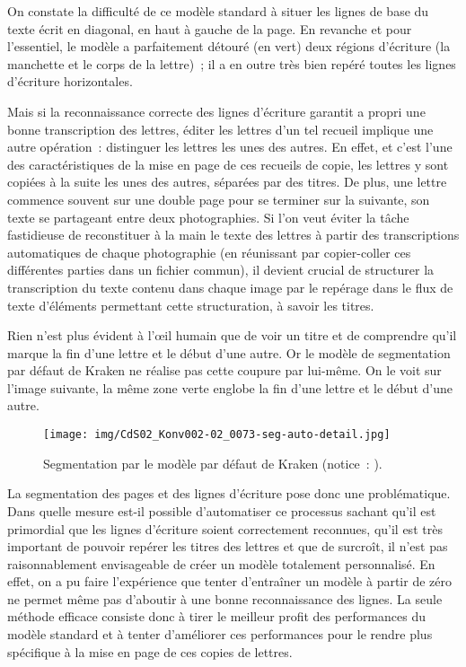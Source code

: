\documentclass[a4paper,12pt,twoside]{book}
\begin{document}
				On constate la difficulté de ce modèle standard à situer les lignes de base du texte écrit en diagonal, en haut à gauche de la page. En revanche et pour l'essentiel, le modèle a parfaitement détouré (en vert) deux régions d'écriture (la manchette et le corps de la lettre)~; il a en outre très bien repéré toutes les lignes d'écriture horizontales.
				
				Mais si la reconnaissance correcte des lignes d'écriture garantit a propri une bonne transcription des lettres, éditer les lettres d'un tel recueil implique une autre opération~: distinguer les lettres les unes des autres. En effet, et c'est l'une des caractéristiques de la mise en page de ces recueils de copie, les lettres y sont copiées à la suite les unes des autres, séparées par des titres. De plus, une lettre commence souvent sur une double page pour se terminer sur la suivante, son texte se partageant entre deux photographies. Si l'on veut éviter la tâche fastidieuse de reconstituer à la main le texte des lettres à partir des transcriptions automatiques de chaque photographie (en réunissant par copier-coller ces différentes parties dans un fichier commun), il devient crucial de structurer la transcription du texte contenu dans chaque image par le repérage dans le flux de texte d'éléments permettant cette structuration, à savoir les titres.
				
				Rien n'est plus évident à l'œil humain que de voir un titre et de comprendre qu'il marque la fin d'une lettre et le début d'une autre. Or le modèle de segmentation par défaut de Kraken ne réalise pas cette coupure par lui-même. On le voit sur l'image suivante, la même zone verte englobe la fin d'une lettre et le début d'une autre.
				
				\begin{figure}[!h]
					\centering
					\texttt{[image: img/CdS02\_Konv002-02\_0073-seg-auto-detail.jpg]}
					\caption{Segmentation par le modèle par défaut de Kraken (notice~: \cite{CdS02073}).}
					\label{}
				\end{figure}
				
				La segmentation des pages et des lignes d'écriture pose donc une problématique. Dans quelle mesure est-il possible d'automatiser ce processus sachant qu'il est primordial que les lignes d'écriture soient correctement reconnues, qu'il est très important de pouvoir repérer les titres des lettres et que de surcroît, il n'est pas raisonnablement envisageable de créer un modèle totalement personnalisé. En effet, on a pu faire l'expérience que tenter d'entraîner un modèle à partir de zéro ne permet même pas d'aboutir à une bonne reconnaissance des lignes. La seule méthode efficace consiste donc à tirer le meilleur profit des performances du modèle standard et à tenter d'améliorer ces performances pour le rendre plus spécifique à la mise en page de ces copies de lettres.
				
\end{document}
